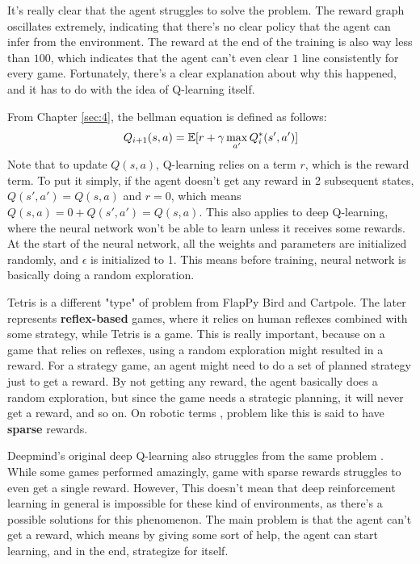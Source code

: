     It's really clear that the agent struggles to solve the problem. The reward graph oscillates extremely, indicating that there's no clear policy that the agent can infer from the environment. The reward at the end of the training is also way less than $100$, which indicates that the agent can't even clear $1$ line consistently for every game. Fortunately, there's a clear explanation about why this happened, and it has to do with the idea of Q-learning itself.
    \par
    From Chapter \ref{sec:4}, the bellman equation is defined as follows:
    \begin{equation*}
         Q_{i+1}(s,a)=\operatorname*{\mathbb{E}}[r+\gamma\max_{a'}Q_i^*(s',a')]
    \end{equation*} 
    Note that to update $Q(s,a)$, Q-learning relies on a term $r$, which is the reward term. To put it simply, if the agent doesn't get any reward in 2 subsequent states, $Q(s',a')=Q(s,a)$ and $r=0$, which means $Q(s,a)=0+Q(s',a')=Q(s,a)$. This also applies to deep Q-learning, where the neural network won't be able to learn unless it receives some rewards. At the start of the neural network, all the weights and parameters are initialized randomly, and $\epsilon$ is initialized to 1. This means before training, neural network is basically doing a random exploration. 
    \par
    Tetris is a different "type" of problem from FlapPy Bird and Cartpole. The later represents \textbf{reflex-based} games, where it relies on human reflexes combined with some strategy, while Tetris is a  game. This is really important, because on a game that relies on reflexes, using a random exploration might resulted in a reward. For a strategy game, an agent might need to do a set of planned strategy just to get a reward. By not getting any reward, the agent basically does a random exploration, but since the game needs a strategic planning, it will never get a reward, and so on. On robotic terms \cite{DBLP:journals/corr/abs-1709-10089}, problem like this is said to have \textbf{sparse} rewards.
    \par
    Deepmind's original deep Q-learning also struggles from the same problem \cite{mnih2015humanlevel}. While some games performed amazingly, game with sparse rewards struggles to even get a single reward. However, This doesn't mean that deep reinforcement learning in general is impossible for these kind of environments, as there's a possible solutions for this phenomenon. The main problem is that the agent can't get a reward, which means by giving some sort of help, the agent can start learning, and in the end, strategize for itself.
